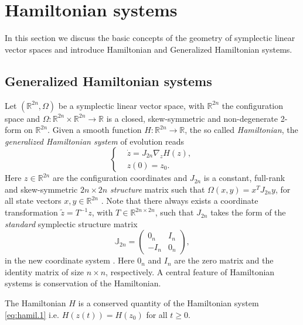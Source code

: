 \section{Hamiltonian systems}
\label{sec:hamil}

In this section we discuss the basic concepts of the geometry of symplectic linear vector spaces and introduce Hamiltonian and Generalized Hamiltonian systems.

\subsection{Generalized Hamiltonian systems}
\label{sec:hamil.1}

Let $(\mathbb R^{2n}, \Omega)$ be a symplectic linear vector space, with $\mathbb R^{2n}$ the configuration space and $\Omega:\mathbb R^{2n}\times\mathbb R^{2n} \to \mathbb R$ is a closed, skew-symmetric and non-degenerate 2-form on $\mathbb R^{2n}$. Given a smooth function $H:\mathbb R^{2n} \to \mathbb R$, the so called \emph{Hamiltonian}, the \emph{generalized Hamiltonian system} of evolution reads
\begin{equation} \label{eq:hamil.1}
\left\{
\begin{aligned}
	& \dot z = J_{2n} \nabla_z H(z),  \\
	&  z(0) = z_0.
\end{aligned}
\right.
\end{equation}
Here $z\in \mathbb R^{2n}$ are the configuration coordinates and $J_{2n}$ is a constant, full-rank and skew-symmetric $2n\times 2n$ \emph{structure} matrix such that $\Omega(x,y) = x^TJ_{2n}y$, for all state vectors $x,y\in \mathbb R^{2n}$ \cite{Marsden:2010:IMS:1965128}. Note that there always exists a coordinate transformation $\tilde z = T^{-1} z$, with $T \in \mathbb R^{2n\times 2n}$, such that $J_{2n}$ takes the form of the \emph{standard} symplectic structure matrix
\begin{equation} \label{eq:hamil.2}
	\mathbb{J}_{2n} = 
	\begin{pmatrix}
	0_n & I_n \\
	-I_n & 0_n
	\end{pmatrix},
\end{equation}
in the new coordinate system \cite{de2006symplectic}.
Here $0_n$ and $I_n$ are the zero matrix and the identity matrix of size $n\times n$, respectively. A central feature of Hamiltonian systems is conservation of the Hamiltonian.

\begin{theorem} \label{thm:1}
\cite{Marsden:2010:IMS:1965128} The Hamiltonian $H$ is a conserved quantity of the Hamiltonian system \eqref{eq:hamil.1} i.e. $H(z(t)) = H(z_0)$ for all $t \geq 0$.
\end{theorem}

